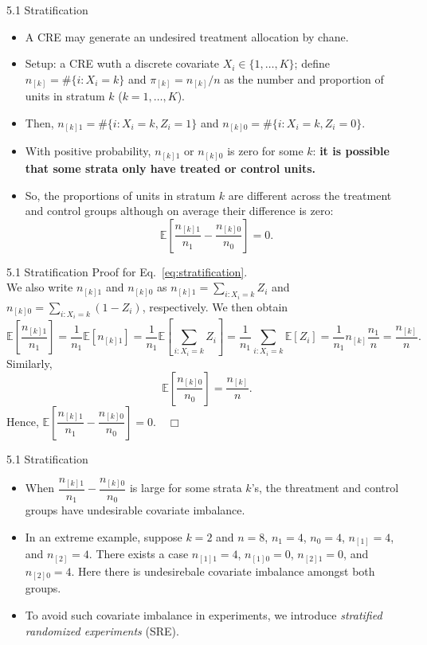 \documentclass[aspectratio=169, 12pt]{beamer}
\begin{document}
\begin{frame}{5.1 Stratification}
  \begin{itemize}
    \item A CRE may generate an undesired treatment allocation by chane. 
    \item Setup: a CRE wuth a discrete covariate $X_i\in \{1,\dots,K\}$; define $n_{[k]}=\# \{i:X_i=k\}$ and $\pi_{[k]}=n_{[k]}/n$ as the number and proportion of units in stratum $k$ ($k=1,\dots,K$).
    \item Then, $n_{[k]1}=\#\{i:X_i=k,Z_i=1\}$ and $n_{[k]0}=\#\{i:X_i=k,Z_i=0\}$.
    \item With positive probability, $n_{[k]1}$ or $n_{[k]0}$ is zero for some $k$: \textbf{it is possible that some strata only have treated or control units.}
    \item So, the proportions of units in stratum $k$ are different across the treatment and control groups although on average their difference is zero:
    \begin{equation}
      \mathbb{E}\left[\frac{n_{[k]1}}{n_1}-\frac{n_{[k]0}}{n_0}\right]=0.
      \label{eq:stratification}
    \end{equation}
   \end{itemize}
\end{frame}

\begin{frame}{5.1 Stratification}
  Proof for Eq.~\eqref{eq:stratification}. \\
  We also write $n_{[k]1}$ and $n_{[k]0}$ as $n_{[k]1}=\sum_{i:X_i=k}^{}Z_i$ and $n_{[k]0}=\sum_{i:X_i=k}^{}(1-Z_i)$, respectively. We then obtain
  \[
  \mathbb{E}\left[\frac{n_{[k]1}}{n_1}\right]=\frac{1}{n_1}\mathbb{E}[n_{[k]1}] = \frac{1}{n_1}\mathbb{E}\left[\sum_{i:X_i=k}^{}Z_i\right]=\frac{1}{n_1}\sum_{i:X_i=k}^{}\mathbb{E}[Z_i] = \frac{1}{n_1}n_{[k]}\frac{n_1}{n} = \frac{n_{[k]}}{n}.
  \]
  Similarly, 
  \[
  \mathbb{E}\left[\frac{n_{[k]0}}{n_0}\right] = \frac{n_{[k]}}{n}.
  \]
  Hence, $\mathbb{E}\left[\dfrac{n_{[k]1}}{n_1}-\dfrac{n_{[k]0}}{n_0}\right]=0. \quad \Box$
  
\end{frame}

\begin{frame}{5.1 Stratification}
  \begin{itemize}
    \item When $\dfrac{n_{[k]1}}{n_1}-\dfrac{n_{[k]0}}{n_0}$ is large for some strata $k$'s, the threatment and control groups have undesirable covariate imbalance.
    \item In an extreme example, suppose $k=2$ and $n=8$, $n_1=4$, $n_0=4$, $n_{[1]}=4$, and $n_{[2]}=4$. There exists a case $n_{[1]1}=4$, $n_{[1]0}=0$, $n_{[2]1}=0$, and $n_{[2]0}=4$. Here there is undesirebale covariate imbalance amongst both groups. 
    \item To avoid such covariate imbalance in experiments, we introduce \textit{stratified randomized experiments} (SRE).
  \end{itemize}
\end{frame}
\end{document}
